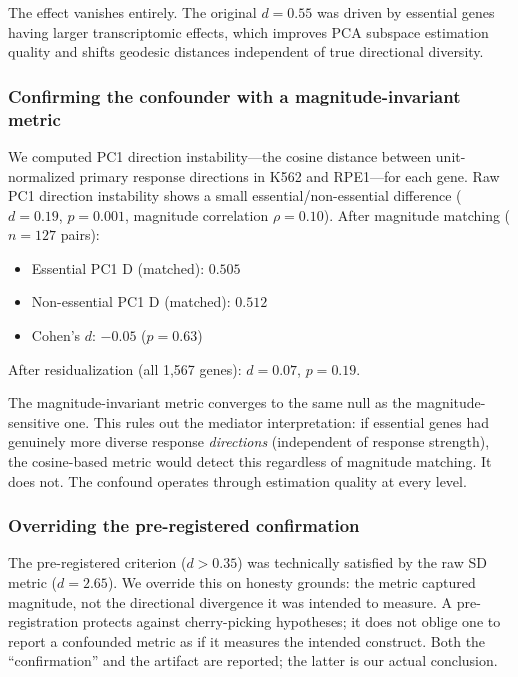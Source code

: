 \documentclass[11pt]{article}
\begin{document}
The effect vanishes entirely. The original $d = 0.55$ was driven by
essential genes having larger transcriptomic effects, which improves PCA
subspace estimation quality and shifts geodesic distances independent of
true directional diversity.

\subsubsection{Confirming the confounder with a magnitude-invariant metric}

We computed PC1 direction instability---the cosine distance between
unit-normalized primary response directions in K562 and RPE1---for each
gene. Raw PC1 direction instability shows a small essential/non-essential
difference ($d = 0.19$, $p = 0.001$, magnitude correlation $\rho =
0.10$). After magnitude matching ($n = 127$ pairs):

\begin{itemize}
  \item Essential PC1 D (matched): $0.505$
  \item Non-essential PC1 D (matched): $0.512$
  \item Cohen's $d$: $-0.05$ ($p = 0.63$)
\end{itemize}

After residualization (all 1{,}567 genes): $d = 0.07$, $p = 0.19$.

The magnitude-invariant metric converges to the same null as the
magnitude-sensitive one. This rules out the mediator interpretation: if
essential genes had genuinely more diverse response \emph{directions}
(independent of response strength), the cosine-based metric would detect
this regardless of magnitude matching. It does not. The confound
operates through estimation quality at every level.

\subsubsection{Overriding the pre-registered confirmation}

The pre-registered criterion ($d > 0.35$) was technically satisfied by
the raw SD metric ($d = 2.65$). We override this on honesty grounds: the
metric captured magnitude, not the directional divergence it was
intended to measure. A pre-registration protects against cherry-picking
hypotheses; it does not oblige one to report a confounded metric as if
it measures the intended construct. Both the ``confirmation'' and the
artifact are reported; the latter is our actual conclusion.
\end{document}
